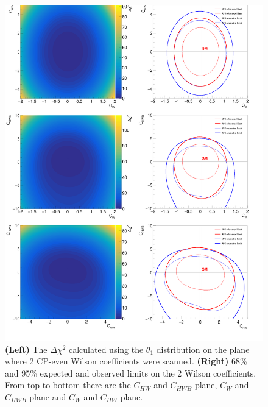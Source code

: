 \documentclass[a4paper,12pt]{article}
\begin{document}
		\begin{figure}[ht]
			\begin{centering}
			\includegraphics[scale=0.1122]{figures/limitC.png}
			\caption{\textbf{(Left)} The $\Delta\chi^2$ calculated using the $\theta_1$ distribution on the plane where 2 CP-even Wilson coefficients were scanned. 
					 \textbf{(Right)} 68\% and 95\% expected and observed limits on the 2 Wilson coefficients.
					 From top to bottom there are the $C_{HW}$ and $C_{HWB}$ plane,  $C_{W}$ and $C_{HWB}$ plane and $C_{W}$ and $C_{HW}$ plane.}
			\label{fig:LimitC}
			\end{centering}
		\end{figure}
\end{document}
